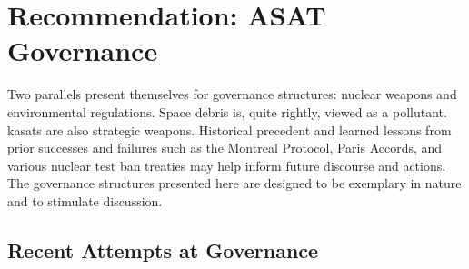 \section{Recommendation: ASAT Governance}
\label{section::governance}

Two parallels present themselves for governance structures: nuclear
weapons and environmental regulations.  Space debris is, quite
rightly, viewed as a pollutant.  \acp{kasat} are also strategic
weapons.  Historical precedent and learned lessons from prior
successes and failures such as the Montreal Protocol, Paris Accords,
and various nuclear test ban treaties may help inform future discourse
and actions.  The governance structures presented here are designed to
be exemplary in nature and to stimulate discussion.


\subsection{Recent Attempts at Governance}
\label{section::governance::prior}

